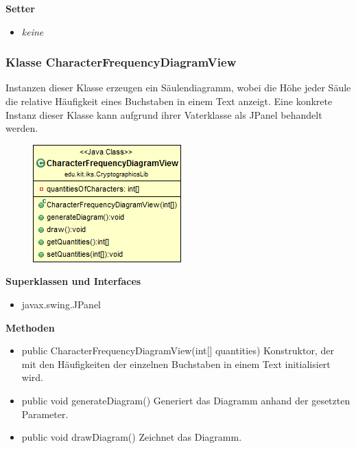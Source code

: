 \documentclass{article}
\begin{document}
      \textbf{Setter}
      \begin{itemize}
        \item \textit{keine}
      \end{itemize}
	
	\subsubsection{Klasse CharacterFrequencyDiagramView}
	  Instanzen dieser Klasse erzeugen ein Säulendiagramm, wobei die
	  Höhe jeder Säule die relative Häufigkeit eines Buchstaben in einem Text anzeigt.
	  Eine konkrete Instanz dieser Klasse kann aufgrund ihrer Vaterklasse als JPanel behandelt werden.
	
      \begin{figure}[H]
        \centering
        \includegraphics{resources/edu-kit-iks-CryptographicsLib-CharacterFrequencyDiagramView}
      \end{figure}
	
      \textbf{Superklassen und Interfaces}
      \begin{itemize}
        \item javax.swing.JPanel
      \end{itemize}
	
      \textbf{Methoden}
      \begin{itemize}
        \item public CharacterFrequencyDiagramView(int[] quantities) \newline
          Konstruktor, der mit den Häufigkeiten der einzelnen Buchstaben in einem Text
          initialisiert wird.
        \item public void generateDiagram() \newline
          Generiert das Diagramm anhand der gesetzten Parameter.
        \item public void drawDiagram() \newline
          Zeichnet das Diagramm.
      \end{itemize}
      
\end{document}

